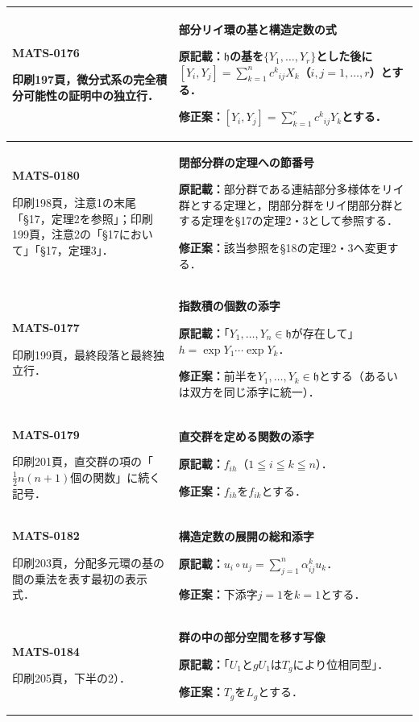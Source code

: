 \documentclass[a4paper,10pt]{ltjsarticle}
\begin{document}
\begin{longtable}{@{}>{\raggedright\arraybackslash}p{.19\linewidth}>{\raggedright\arraybackslash}p{.77\linewidth}@{}}
\hline
\hypertarget{MATS-0176}{}\textbf{MATS-0176}\par 印刷197頁，微分式系の完全積分可能性の証明中の独立行． & \textbf{部分リイ環の基と構造定数の式}\par\textbf{原記載：}$\mathfrak h$の基を$\{Y_1,\ldots,Y_r\}$とした後に$[Y_i,Y_j]=\sum_{k=1}^{n}c^k{}_{ij}X_k$（$i,j=1,\ldots,r$）とする．\par\textbf{修正案：}$[Y_i,Y_j]=\sum_{k=1}^{r}c^k{}_{ij}Y_k$とする． \\[3pt]
\hline
\hypertarget{MATS-0180}{}\textbf{MATS-0180}\par 印刷198頁，注意1の末尾「§17，定理2を参照」；印刷199頁，注意2の「§17において」「§17，定理3」． & \textbf{閉部分群の定理への節番号}\par\textbf{原記載：}部分群である連結部分多様体をリイ群とする定理と，閉部分群をリイ閉部分群とする定理を§17の定理2・3として参照する．\par\textbf{修正案：}該当参照を§18の定理2・3へ変更する． \\[3pt]
\hline
\hypertarget{MATS-0177}{}\textbf{MATS-0177}\par 印刷199頁，最終段落と最終独立行． & \textbf{指数積の個数の添字}\par\textbf{原記載：}「$Y_1,\ldots,Y_n\in\mathfrak h$が存在して」$h=\exp Y_1\cdots\exp Y_k$．\par\textbf{修正案：}前半を$Y_1,\ldots,Y_k\in\mathfrak h$とする（あるいは双方を同じ添字に統一）． \\[3pt]
\hline
\hypertarget{MATS-0179}{}\textbf{MATS-0179}\par 印刷201頁，直交群の項の「$\frac12n(n+1)$個の関数」に続く記号． & \textbf{直交群を定める関数の添字}\par\textbf{原記載：}$f_{ih}$（$1\leqq i\leqq k\leqq n$）．\par\textbf{修正案：}$f_{ih}$を$f_{ik}$とする． \\[3pt]
\hline
\hypertarget{MATS-0182}{}\textbf{MATS-0182}\par 印刷203頁，分配多元環の基の間の乗法を表す最初の表示式． & \textbf{構造定数の展開の総和添字}\par\textbf{原記載：}$u_i\circ u_j=\sum_{j=1}^n\alpha^k_{ij}u_k$．\par\textbf{修正案：}下添字$j=1$を$k=1$とする． \\[3pt]
\hline
\hypertarget{MATS-0184}{}\textbf{MATS-0184}\par 印刷205頁，下半の2）． & \textbf{群の中の部分空間を移す写像}\par\textbf{原記載：}「$U_1$と$gU_1$は$T_g$により位相同型」．\par\textbf{修正案：}$T_g$を$L_g$とする． \\[3pt]

\end{longtable}
\end{document}
